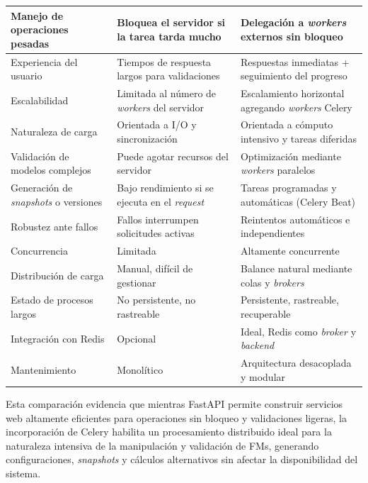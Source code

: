 \begin{longtable}{|p{5cm}|p{5cm}|p{5cm}|}
    Manejo de operaciones pesadas & Bloquea el servidor si la tarea tarda mucho & Delegación a \textit{workers} externos sin bloqueo \\ 
    \hline
    \rowcolor[HTML]{EDEBF1}
    Experiencia del usuario & Tiempos de respuesta largos para validaciones & Respuestas inmediatas + seguimiento del progreso \\ 
    \hline
    Escalabilidad & Limitada al número de \textit{workers} del servidor & Escalamiento horizontal agregando \textit{workers} Celery \\ 
    \hline
    \rowcolor[HTML]{EDEBF1}
    Naturaleza de carga & Orientada a \ac{I/O} y sincronización & Orientada a cómputo intensivo y tareas diferidas \\ 
    \hline
    Validación de modelos complejos & Puede agotar recursos del servidor & Optimización mediante \textit{workers} paralelos \\ 
    \hline
    \rowcolor[HTML]{EDEBF1}
    Generación de \textit{snapshots} o versiones & Bajo rendimiento si se ejecuta en el \textit{request} & Tareas programadas y automáticas (Celery Beat) \\ 
    \hline
    Robustez ante fallos & Fallos interrumpen solicitudes activas & Reintentos automáticos e independientes \\ 
    \hline
    \rowcolor[HTML]{EDEBF1}
    Concurrencia & Limitada & Altamente concurrente \\ 
    \hline
    Distribución de carga & Manual, difícil de gestionar & Balance natural mediante colas y \textit{brokers} \\ 
    \hline
    \rowcolor[HTML]{EDEBF1}
    Estado de procesos largos & No persistente, no rastreable & Persistente, rastreable, recuperable \\ 
    \hline
    Integración con Redis & Opcional & Ideal, Redis como \textit{broker} y \textit{backend} \\ 
    \hline
    \rowcolor[HTML]{EDEBF1}
    Mantenimiento & Monolítico & Arquitectura desacoplada y modular \\ 
    \hline
\end{longtable}

Esta comparación evidencia que mientras FastAPI permite construir servicios web 
altamente eficientes para operaciones sin bloqueo y validaciones ligeras, la 
incorporación de Celery habilita un procesamiento distribuido ideal 
para la naturaleza intensiva de la manipulación y validación de \ac{FM}s, 
generando configuraciones, \textit{snapshots} y cálculos alternativos sin afectar la 
disponibilidad del sistema.
    
